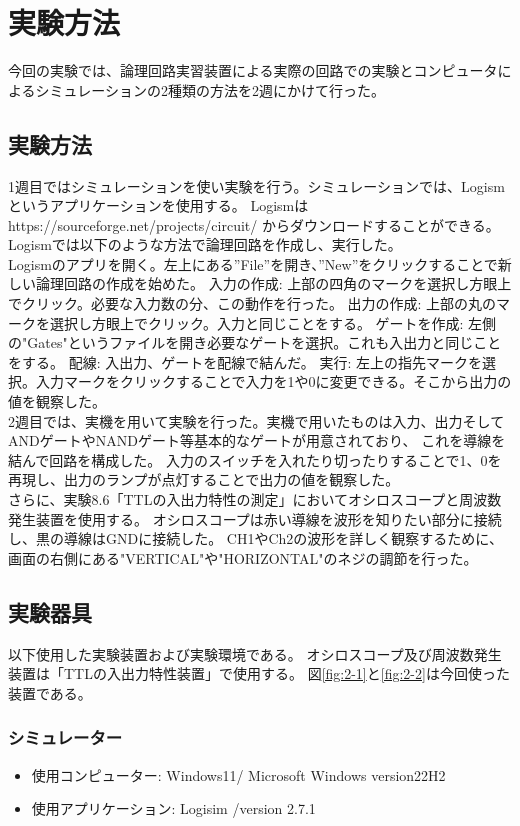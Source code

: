 \documentclass[dvipdfmx]{jsarticle}
\begin{document}
\section{実験方法}
今回の実験では、論理回路実習装置による実際の回路での実験とコンピュータによるシミュレーションの2種類の方法を2週にかけて行った。

\subsection{実験方法}
1週目ではシミュレーションを使い実験を行う。シミュレーションでは、Logismというアプリケーションを使用する。
Logismはhttps://sourceforge.net/projects/circuit/ からダウンロードすることができる。\\
Logismでは以下のような方法で論理回路を作成し、実行した。\\

Logismのアプリを開く。左上にある”File”を開き、”New”をクリックすることで新しい論理回路の作成を始めた。
入力の作成: 上部の四角のマークを選択し方眼上でクリック。必要な入力数の分、この動作を行った。
出力の作成: 上部の丸のマークを選択し方眼上でクリック。入力と同じことをする。
ゲートを作成: 左側の"Gates"というファイルを開き必要なゲートを選択。これも入出力と同じことをする。
配線: 入出力、ゲートを配線で結んだ。
実行: 左上の指先マークを選択。入力マークをクリックすることで入力を1や0に変更できる。そこから出力の値を観察した。\\


2週目では、実機を用いて実験を行った。実機で用いたものは入力、出力そしてANDゲートやNANDゲート等基本的なゲートが用意されており、
これを導線を結んで回路を構成した。
入力のスイッチを入れたり切ったりすることで1、0を再現し、出力のランプが点灯することで出力の値を観察した。\\

さらに、実験8.6「TTLの入出力特性の測定」においてオシロスコープと周波数発生装置を使用する。
オシロスコープは赤い導線を波形を知りたい部分に接続し、黒の導線はGNDに接続した。
CH1やCh2の波形を詳しく観察するために、画面の右側にある"VERTICAL"や"HORIZONTAL"のネジの調節を行った。

\subsection{実験器具}
以下使用した実験装置および実験環境である。
オシロスコープ及び周波数発生装置は「TTLの入出力特性装置」で使用する。
図\ref*{fig:2-1}と\ref*{fig:2-2}は今回使った装置である。

\subsubsection*{シミュレーター}
\begin{itemize}
  \item 使用コンピューター: Windows11/ Microsoft Windows version22H2
  \item 使用アプリケーション: Logisim /version 2.7.1
\end{itemize}
\end{document}
